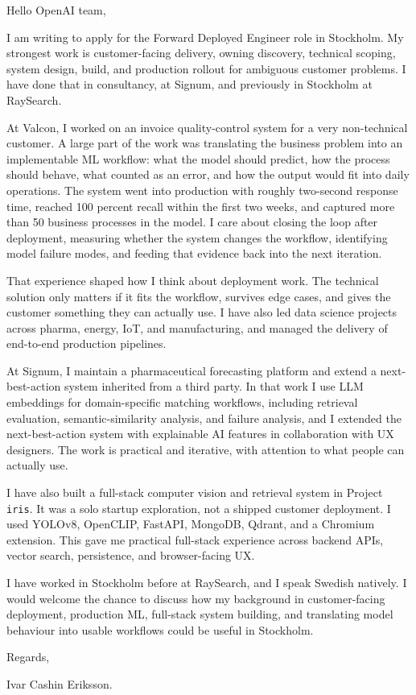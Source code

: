 \documentclass[11pt,a4paper]{moderncv}
\begin{document}
\makecvtitle
Hello OpenAI team,

\vspace*{2em}
I am writing to apply for the Forward Deployed Engineer role in Stockholm. My strongest work is customer-facing delivery, owning discovery, technical scoping, system design, build, and production rollout for ambiguous customer problems. I have done that in consultancy, at Signum, and previously in Stockholm at RaySearch.

\hspace*{2em}
At Valcon, I worked on an invoice quality-control system for a very non-technical customer. A large part of the work was translating the business problem into an implementable ML workflow: what the model should predict, how the process should behave, what counted as an error, and how the output would fit into daily operations. The system went into production with roughly two-second response time, reached 100 percent recall within the first two weeks, and captured more than 50 business processes in the model. I care about closing the loop after deployment, measuring whether the system changes the workflow, identifying model failure modes, and feeding that evidence back into the next iteration.

\hspace*{2em}
That experience shaped how I think about deployment work. The technical solution only matters if it fits the workflow, survives edge cases, and gives the customer something they can actually use. I have also led data science projects across pharma, energy, IoT, and manufacturing, and managed the delivery of end-to-end production pipelines.

\hspace*{2em}
At Signum, I maintain a pharmaceutical forecasting platform and extend a next-best-action system inherited from a third party. In that work I use LLM embeddings for domain-specific matching workflows, including retrieval evaluation, semantic-similarity analysis, and failure analysis, and I extended the next-best-action system with explainable AI features in collaboration with UX designers. The work is practical and iterative, with attention to what people can actually use.

\hspace*{2em}
I have also built a full-stack computer vision and retrieval system in Project \texttt{iris}. It was a solo startup exploration, not a shipped customer deployment. I used YOLOv8, OpenCLIP, FastAPI, MongoDB, Qdrant, and a Chromium extension. This gave me practical full-stack experience across backend APIs, vector search, persistence, and browser-facing UX.

\hspace*{2em}
I have worked in Stockholm before at RaySearch, and I speak Swedish natively. I would welcome the chance to discuss how my background in customer-facing deployment, production ML, full-stack system building, and translating model behaviour into usable workflows could be useful in Stockholm.

\vspace*{2em}
Regards,

\vspace*{1em}
Ivar Cashin Eriksson.
\end{document}
